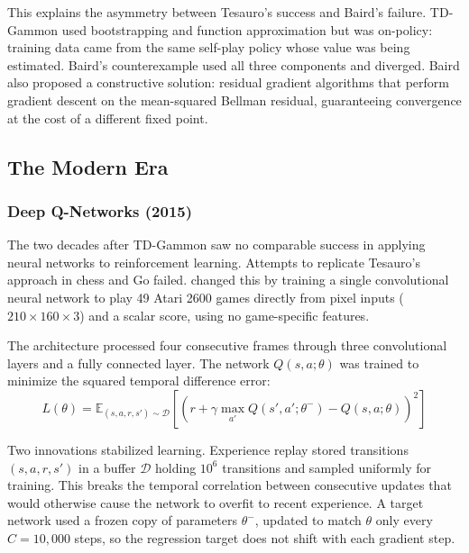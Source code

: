 This explains the asymmetry between Tesauro's success and Baird's failure. TD-Gammon used bootstrapping and function approximation but was on-policy: training data came from the same self-play policy whose value was being estimated. Baird's counterexample used all three components and diverged. Baird also proposed a constructive solution: residual gradient algorithms that perform gradient descent on the mean-squared Bellman residual, guaranteeing convergence at the cost of a different fixed point.


\subsection{The Modern Era}

\subsubsection{Deep Q-Networks (2015)}

The two decades after TD-Gammon saw no comparable success in applying neural networks to reinforcement learning. Attempts to replicate Tesauro's approach in chess and Go failed. \citet{mnih2015} changed this by training a single convolutional neural network to play 49 Atari 2600 games directly from pixel inputs ($210 \times 160 \times 3$) and a scalar score, using no game-specific features.

The architecture processed four consecutive frames through three convolutional layers and a fully connected layer. The network $Q(s, a; \theta)$ was trained to minimize the squared temporal difference error:
\begin{equation}
L(\theta) = \mathbb{E}_{(s,a,r,s') \sim \mathcal{D}} \left[ \left( r + \gamma \max_{a'} Q(s', a'; \theta^-) - Q(s, a; \theta) \right)^2 \right]
\end{equation}

Two innovations stabilized learning. Experience replay stored transitions $(s, a, r, s')$ in a buffer $\mathcal{D}$ holding $10^6$ transitions and sampled uniformly for training. This breaks the temporal correlation between consecutive updates that would otherwise cause the network to overfit to recent experience. A target network used a frozen copy of parameters $\theta^-$, updated to match $\theta$ only every $C = 10{,}000$ steps, so the regression target does not shift with each gradient step.


